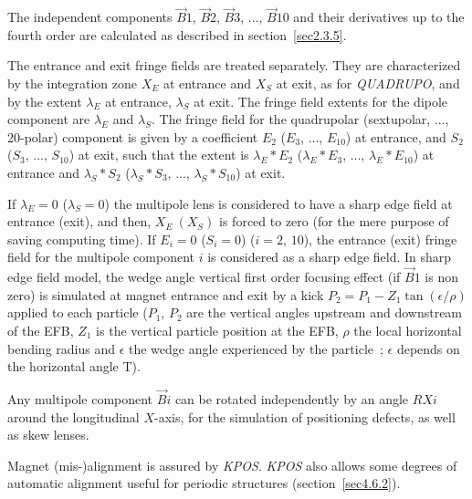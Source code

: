 \noindent The independent components $ \vec  B1$, $\vec  B2$, $\vec  B3$, ..., 
$ \vec  B10 $  and their derivatives up to the fourth order are calculated as described in 
 section~\ref{sec2.3.5}.  

\medskip

\noindent The entrance and exit fringe fields are treated separately.  They
are characterized by the integration zone $ X_E $ at entrance and $ X_S $ at exit,
as for \textsl{QUADRUPO}, and by the extent $ \lambda_ E $ at entrance, 
$\lambda_ S $ at exit. The fringe field extents for the dipole component are $ \lambda_ E $ 
and $ \lambda_ S $. The fringe field for the quadrupolar 
(sextupolar,  ..., 20-polar) component is given by a coefficient $ E_2 $ 
 ($E_3$, ..., $E_{10}$)  at entrance, and 
$ S_2 $ ($ S_3$, ..., $S_{10}$)  at exit, such that the extent is $ \lambda_ E\ast E_2$
 ($\lambda_ E\ast E_3$, ..., $\lambda_ E\ast E_{10}$)  at 
entrance and $ \lambda_ S\ast S_2 $  ($\lambda_ S\ast S_3$, ..., $\lambda_ S\ast S_{10}$)  
at exit. 
\medskip

\noindent If $ \lambda_ E=0 $  ($\lambda_ S=0$)  the multipole lens is
considered to have a sharp edge field at entrance (exit), and then, $ X_E \ (X_S) $ is forced to zero 
(for the mere purpose of saving computing time).  If $ E_i=0 $  ($S_i=0$) ($i=2,\, 10$), the entrance (exit) fringe field for 
 the multipole component $ i $ is considered as a sharp edge field.  
In sharp edge field model, the wedge angle vertical first order focusing effect (if $\vec  B1$ is non zero) is simulated at magnet entrance and exit  by a kick $P_2 = P_1 - Z_1 \tan (\epsilon / \rho)$ applied to each particle ($P_1$, $P_2$ are the vertical angles upstream and downstream of the EFB, $Z_1$ is the vertical particle position at the EFB, $\rho$ the local horizontal bending radius and $\epsilon$ the wedge angle experienced by the particle~; $\epsilon$ depends on the horizontal angle T). 

\medskip

\noindent Any multipole component $ \vec  Bi $ can be rotated independently
by an angle $ RXi $ around the longitudinal $ X$-axis, for the simulation of positioning defects,
as well as skew lenses. 

\medskip

\noindent Magnet (mis-)alignment is assured by \textsl{KPOS}. 
\textsl{KPOS} also  allows some degrees of automatic alignment useful for periodic structures (section~\ref{sec4.6.2}).



